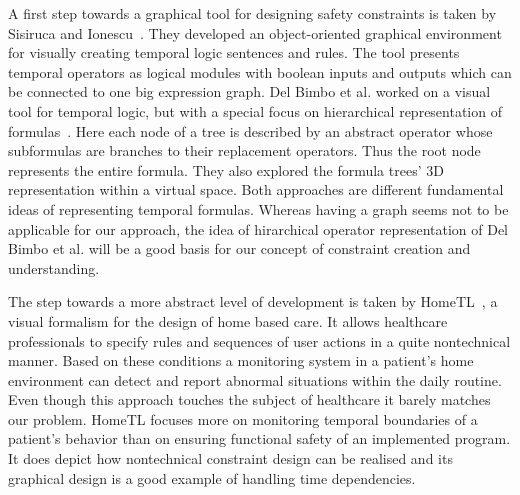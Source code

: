 \documentclass[conference]{IEEEtran}
\begin{document}
A first step towards a graphical tool for designing safety constraints is taken by Sisiruca and Ionescu~\cite{332301}. They developed an object-oriented graphical environment for visually creating temporal logic sentences and rules. The tool presents temporal operators as logical modules with boolean inputs and outputs which can be connected to one big expression graph. Del Bimbo et al. worked on a visual tool for temporal logic, but with a special focus on hierarchical representation of formulas~\cite{520786}. Here each node of a tree is described by an abstract operator whose subformulas are branches to their replacement operators. Thus the root node represents the entire formula. They also explored the formula trees' 3D representation within a virtual space. Both approaches are different fundamental ideas of representing temporal formulas. Whereas having a graph  seems not to be applicable for our approach, the idea of hirarchical operator representation of Del Bimbo et al. will be a good basis for our concept of constraint creation and understanding.


The step towards a more abstract level of development is taken by HomeTL~\cite{4341725}, a visual formalism for the design of home based care. It allows healthcare professionals to specify rules and sequences of user actions in a quite nontechnical manner. Based on these conditions a monitoring system in a patient's home environment can detect and report abnormal situations within the daily routine. Even though this approach touches the subject of healthcare it barely matches our problem. HomeTL focuses more on monitoring temporal boundaries of a patient's behavior than on ensuring functional safety of an implemented program. It does depict how nontechnical constraint design can be realised and its graphical design is a good example of handling time dependencies.


\end{document}
